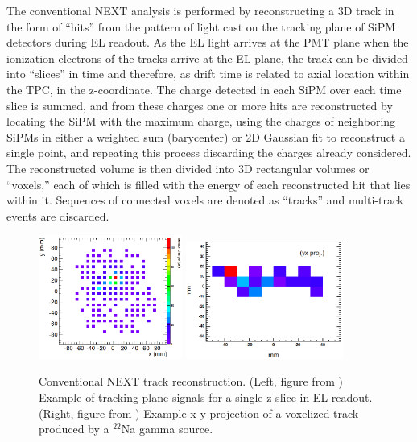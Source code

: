 \documentclass[11pt,a4paper]{article}
\begin{document}
The conventional NEXT analysis is performed by reconstructing a 3D track in the form of ``hits'' from the pattern of light cast on the tracking plane of SiPM detectors during EL readout. As the EL light arrives at the PMT plane when the ionization electrons of the tracks arrive at the EL plane, the track can be divided into ``slices'' in time and therefore, as drift time is related to axial location within the TPC, in the z-coordinate. The charge detected in each SiPM over each time slice is summed, and from these charges one or more hits are reconstructed by locating the SiPM with the maximum charge, using the charges of neighboring SiPMs in either a weighted sum (barycenter) or 2D Gaussian fit to reconstruct a single point, and repeating this process discarding the charges already considered. The reconstructed volume is then divided into 3D rectangular volumes or ``voxels,'' each of which is filled with the energy of each reconstructed hit that lies within it. Sequences of connected voxels are denoted as ``tracks'' and multi-track events are discarded.

\begin{figure}[!htb]
	\centering
	\includegraphics[width= 0.42\textwidth]{fig/sipm_map.png}
	\includegraphics[width= 0.46\textwidth]{fig/xy_proj.png}
	\caption{Conventional NEXT track reconstruction. (Left, figure from \cite{NEXT_topology}) Example of tracking plane signals for a single z-slice in EL readout. (Right, figure from \cite{NEXT_topology}) Example x-y projection of a voxelized track produced by a $^{22}$Na gamma source.} \label{fig.recon}
\end{figure}
\end{document}
